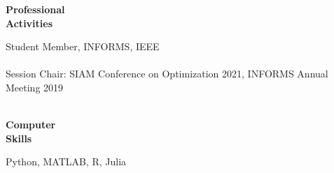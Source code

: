 \documentclass[11pt]{article}
\newcommand{\TSP}{IEEE Transactions on Signal Processing}
\newcommand{\SIOPT}{SIAM Journal on Optimization}
\newcommand{\JMLR}{Journal of Machine Learning Research}
\newcommand{\MPA}{Mathematical Programming Series A}
\newcommand{\COA}{Computational Optimization and Applications}
\newcommand{\JOTA}{Journal of Optimization Theory and Applications}
\begin{document}
\begin{minipage}[t]{0.18\textwidth}
\textbf{Professional \\Activities}
\end{minipage}
\begin{minipage}[t]{0.8\textwidth}
Student Member, INFORMS, IEEE\\\\
Session Chair: SIAM Conference on Optimization 2021, INFORMS Annual Meeting 2019\\\\
\end{minipage} \newline\newline





\begin{minipage}[t]{0.18\textwidth}
\textbf{Computer\\ Skills}
\end{minipage}
\begin{minipage}[t]{0.8\textwidth}
Python, MATLAB, R, Julia 
\end{minipage} \newline\newline
\end{document}
